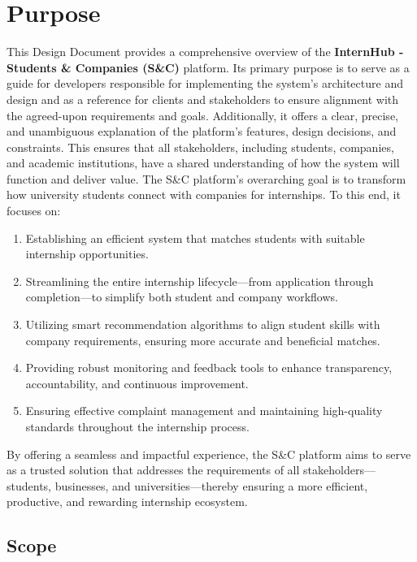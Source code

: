 \section{Purpose}
\label{sec:purpose}%
This Design Document provides a comprehensive overview of the \textbf{InternHub - Students \& Companies (S\&C)} platform. Its primary purpose is to serve as a guide for developers responsible for implementing the system’s architecture and design and as a reference for clients and stakeholders to ensure alignment with the agreed-upon requirements and goals.
Additionally, it offers a clear, precise, and unambiguous explanation of the platform’s features, design decisions, and constraints. This ensures that all stakeholders, including students, companies, and academic institutions, have a shared understanding of how the system will function and deliver value.
The S\&C platform’s overarching goal is to transform how university students connect with companies for internships. To this end, it focuses on:

\begin{enumerate}
    \item Establishing an efficient system that matches students with suitable internship opportunities.
    \item Streamlining the entire internship lifecycle—from application through completion—to simplify both student and company workflows. 
    \item Utilizing smart recommendation algorithms to align student skills with company requirements, ensuring more accurate and beneficial matches.
    \item Providing robust monitoring and feedback tools to enhance transparency, accountability, and continuous improvement.
    \item Ensuring effective complaint management and maintaining high-quality standards throughout the internship process.
\end{enumerate}

By offering a seamless and impactful experience, the S\&C platform aims to serve as a trusted solution that addresses the requirements of all stakeholders—students, businesses, and universities—thereby ensuring a more efficient, productive, and rewarding internship ecosystem.

\subsection{Scope}
\label{subsec:scope}%
\setcounter{g}{1}
\newcommand{\cg}{\theg\stepcounter{g}}

